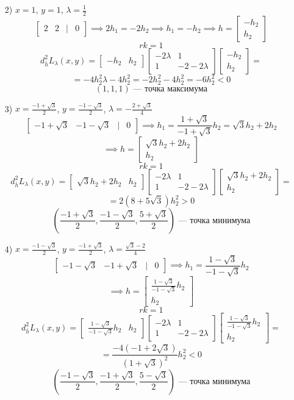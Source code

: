 \documentclass[a4paper]{article}
\newcommand{\matsq}[1]{\begin{bmatrix} #1 \end{bmatrix}}
\renewcommand{\f}[2]{\frac{#1}{#2}}
\begin{document}
\begin{enumerate}
\begin{enumerate}
\begin{enumerate}
            \item[2)] \( x = 1 \), \( y = 1 \), \( \lambda = \frac{1}{2} \)\\
            $$\matsq{2 & 2 & | & 0} \implies 2h_1 = -2h_2 \implies h_1 = -h_2 
            \implies h=\matsq{-h_2\\h_2}  $$
            $$rk = 1$$
            $$d_{\bar{h}}^2L_{\lambda}(x, y) = \matsq{-h_2 & h_2} 
            \matsq{
                -2\lambda & 1\\
                1 & -2-2\lambda
            }
            \matsq{-h_2 \\ h_2} =$$
            $$= -4h_2^2\lambda-4h_2^2=-2h_2^2-4h_2^2 = -6h_2^2 < 0$$
            $$(1, 1, 1) \text{ --- точка максимума}$$

            \item[3)]
            \( x = \frac{-1 + \sqrt{3}}{2} \), \( y = \frac{-1 - \sqrt{3}}{2} \),  
            \( \lambda = -\f{2+\sqrt{3}}{4}\)\\
            $$\matsq{-1 + \sqrt{3} & -1 - \sqrt{3} & | & 0} 
            \implies h_1 =\f{1+\sqrt{3}}{-1+\sqrt{3}}h_2 =\sqrt{3}h_2 + 2h_2$$
            $$\implies h=\matsq{\sqrt{3}h_2 + 2h_2\\h_2}  $$
            $$rk = 1$$
            $$d_{\bar{h}}^2L_{\lambda}(x, y) = \matsq{\sqrt{3}h_2 + 2h_2& h_2} 
            \matsq{
                -2\lambda & 1\\
                1 & -2-2\lambda
            }
            \matsq{\sqrt{3}h_2 + 2h_2 \\ h_2} =$$
            $$= 2(8 + 5\sqrt{3}) h_2^2 > 0$$
            $$(\frac{-1 + \sqrt{3}}{2}, \frac{-1 - \sqrt{3}}{2}, \frac{5 + \sqrt{3}}{2}) 
            \text{ --- точка минимума}$$

            \item[4)]\( x = \frac{-1 - \sqrt{3}}{2} \), \( y = \frac{-1 + \sqrt{3}}{2} \),  
            \( \lambda = \f{\sqrt{3}-2}{4}\)\\
            $$\matsq{-1 -\sqrt{3} & -1 + \sqrt{3} & | & 0} 
            \implies h_1 =\f{1-\sqrt{3}}{-1-\sqrt{3}}h_2$$
            $$\implies h=\matsq{\f{1-\sqrt{3}}{-1-\sqrt{3}}h_2\\h_2}  $$
            $$rk = 1$$
            $$d_{\bar{h}}^2L_{\lambda}(x, y) = \matsq{\f{1-\sqrt{3}}{-1-\sqrt{3}}h_2& h_2} 
            \matsq{
                -2\lambda & 1\\
                1 & -2-2\lambda
            }
            \matsq{\f{1-\sqrt{3}}{-1-\sqrt{3}}h_2\\ h_2} =$$
            $$= \frac{-4(-1 + 2\sqrt{3})}{(1 + \sqrt{3})^2} h_2^2 < 0$$
            $$(\frac{-1 - \sqrt{3}}{2}, \frac{-1 + \sqrt{3}}{2}, \frac{5 -\sqrt{3}}{2}) 
            \text{ --- точка минимума}$$
        \end{enumerate}


\end{enumerate}
\end{enumerate}
\end{document}
